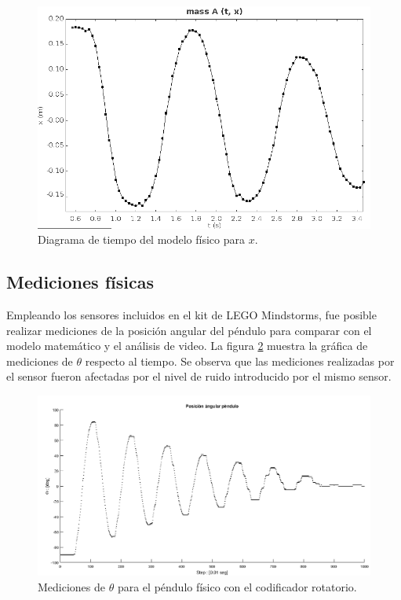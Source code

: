 \begin{figure}[hb!]
 \centering
 \includegraphics[scale=0.45]{./img/tracker_poc_timeplot_x.png}
 \caption{Diagrama de tiempo del modelo físico para $x$.}
 \label{fig: tracker time diagram x}
\end{figure}

\subsection{Mediciones físicas}

Empleando los sensores incluidos en el kit de LEGO
Mindstorms, fue posible realizar mediciones de la 
posición angular del péndulo para comparar con el
modelo matemático y el análisis de video.
La figura \ref{fig: mindstorms theta} muestra la
gráfica de mediciones de $\theta$ respecto al tiempo.
Se observa que las mediciones realizadas por el sensor
fueron afectadas por el nivel de ruido introducido 
por el mismo sensor.

\begin{figure}[hb!]
 \centering
 \includegraphics[scale=0.4]{../Mindstorms/Pendulin2_bw.png}
 \caption{Mediciones de $\theta$ para el péndulo físico con el codificador rotatorio.}
 \label{fig: mindstorms theta}
\end{figure}


\clearpage
